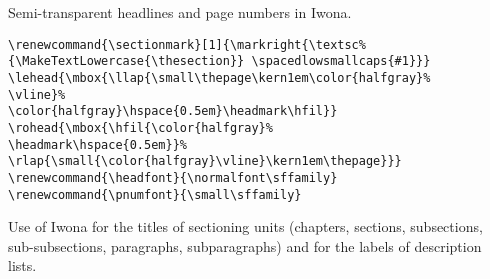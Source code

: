 Semi-transparent headlines and page numbers in Iwona.
\begin{lstlisting}
\renewcommand{\sectionmark}[1]{\markright{\textsc%
{\MakeTextLowercase{\thesection}} \spacedlowsmallcaps{#1}}}
\lehead{\mbox{\llap{\small\thepage\kern1em\color{halfgray}%
\vline}%
\color{halfgray}\hspace{0.5em}\headmark\hfil}} 
\rohead{\mbox{\hfil{\color{halfgray}%
\headmark\hspace{0.5em}}%
\rlap{\small{\color{halfgray}\vline}\kern1em\thepage}}}
\renewcommand{\headfont}{\normalfont\sffamily}
\renewcommand{\pnumfont}{\small\sffamily}
\end{lstlisting}


  
Use of Iwona for the titles of sectioning units (chapters, sections, subsections, sub-subsections, paragraphs, subparagraphs) and for the labels of description lists.
